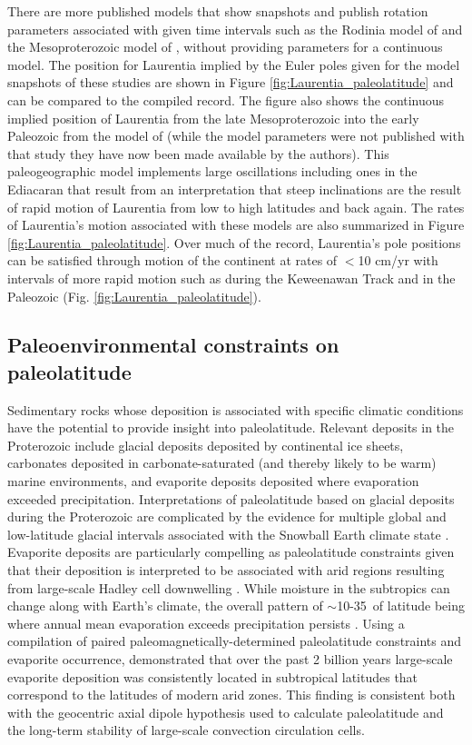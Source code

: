 \documentclass[twocolumn, switch]{article} %
\begin{document}
There are more published models that show snapshots and publish rotation parameters associated with given time intervals such as the Rodinia model of \cite{Li2008a} and the Mesoproterozoic model of \cite{Pisarevsky2014b}, without providing parameters for a continuous model. The position for Laurentia implied by the Euler poles given for the model snapshots of these studies are shown in Figure \ref{fig:Laurentia_paleolatitude} and can be compared to the compiled record. The figure also shows the continuous implied position of Laurentia from the late Mesoproterozoic into the early Paleozoic from the model of \citet{Li2013a} (while the model parameters were not published with that study they have now been made available by the authors). This paleogeographic model implements large oscillations including ones in the Ediacaran that result from an interpretation that steep inclinations are the result of rapid motion of Laurentia from low to high latitudes and back again. The rates of Laurentia's motion associated with these models are also summarized in Figure \ref{fig:Laurentia_paleolatitude}. Over much of the record, Laurentia's pole positions can be satisfied through motion of the continent at rates of $<$10 cm/yr with intervals of more rapid motion such as during the Keweenawan Track and in the Paleozoic (Fig. \ref{fig:Laurentia_paleolatitude}).

\subsection{Paleoenvironmental constraints on paleolatitude}

Sedimentary rocks whose deposition is associated with specific climatic conditions have the potential to provide insight into paleolatitude. Relevant deposits in the Proterozoic include glacial deposits deposited by continental ice sheets, carbonates deposited in carbonate-saturated (and thereby likely to be warm) marine environments, and evaporite deposits deposited where evaporation exceeded precipitation. Interpretations of paleolatitude based on glacial deposits during the Proterozoic are complicated by the evidence for multiple global and low-latitude glacial intervals associated with the Snowball Earth climate state \citep{Evans2003b}. Evaporite deposits are particularly compelling as paleolatitude constraints given that their deposition is interpreted to be associated with arid regions resulting from large-scale Hadley cell downwelling \citep{Evans2006a}. While moisture in the subtropics can change along with Earth's climate, the overall pattern of $\sim$10-35\textdegree\ of latitude being where annual mean evaporation exceeds precipitation persists \citep{Burls2017a}. Using a compilation of paired paleomagnetically-determined paleolatitude constraints and evaporite occurrence, \cite{Evans2006a} demonstrated that over the past 2 billion years large-scale evaporite deposition was consistently located in subtropical latitudes that correspond to the latitudes of modern arid zones. This finding is consistent both with the geocentric axial dipole hypothesis used to calculate paleolatitude and the long-term stability of large-scale convection circulation cells. 
\end{document}
